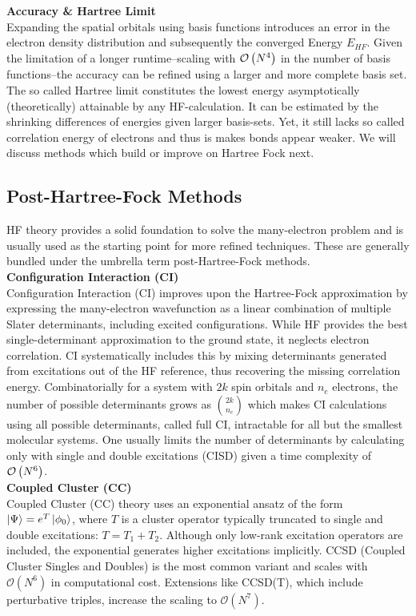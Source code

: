 \textbf{Accuracy \& Hartree Limit}\\
Expanding the spatial orbitals using basis functions introduces an error in the electron density distribution and subsequently the converged Energy $E_{HF}$. Given the limitation of a longer runtime--scaling with $\mathcal{O}\left(N^4\right)$ in the number of basis functions--the accuracy can be refined using a larger and more complete basis set. The so called Hartree limit constitutes the lowest energy asymptotically (theoretically) attainable by any HF-calculation. It can be estimated by the shrinking differences of energies given larger basis-sets. \parencite{ref:Jensen2005hf} Yet, it still lacks so called correlation energy of electrons and thus is makes bonds appear weaker. We will discuss methods which build or improve on Hartree Fock next. 

\subsection{Post-Hartree-Fock Methods}
\label{subsec:background_post_hf}
HF theory provides a solid foundation to solve the many-electron problem and is usually used as the starting point for more refined techniques. These are generally bundled under the umbrella term post-Hartree-Fock methods.\\

\textbf{Configuration Interaction (CI)}\\
Configuration Interaction (CI) improves upon the Hartree-Fock approximation by expressing the many-electron wavefunction as a linear combination of multiple Slater determinants, including excited configurations. While HF provides the best single-determinant approximation to the ground state, it neglects electron correlation. CI systematically includes this by mixing determinants generated from excitations out of the HF reference, thus recovering the missing correlation energy. Combinatorially for a system with $2k$ spin orbitals and $n_e$ electrons, the number of possible determinants grows as $\binom{2k}{n_e}$ which makes CI calculations using all possible determinants, called full CI, intractable for all but the smallest molecular systems. One usually limits the number of determinants by calculating only with single and double excitations (CISD) given a time complexity of $\mathcal{O}\left(N^6\right)$.\\

\textbf{Coupled Cluster (CC)}\\
Coupled Cluster (CC) theory uses an exponential ansatz of the form $\ket{\Psi} = e^T \ket{\phi_0}$, where $T$ is a cluster operator typically truncated to single and double excitations: $T = T_1 + T_2$. Although only low-rank excitation operators are included, the exponential generates higher excitations implicitly. CCSD (Coupled Cluster Singles and Doubles) is the most common variant and scales with $\mathcal{O}(N^6)$ in computational cost. Extensions like CCSD(T), which include perturbative triples, increase the scaling to $\mathcal{O}(N^7)$.

